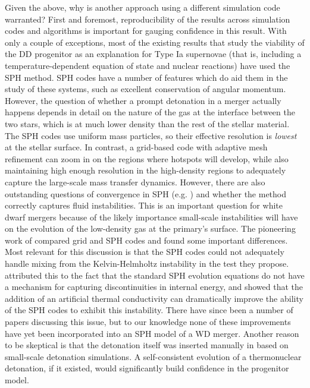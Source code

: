 \documentclass[12pt,preprint]{aastex}
\begin{document}
Given the above, why is another approach using a different simulation code warranted? First and foremost, reproducibility of the results across simulation codes and algorithms is important for gauging confidence in this result. With only a couple of exceptions, most of the existing results that study the viability of the DD progenitor as an explanation for Type Ia supernovae (that is, including a temperature-dependent equation of state and nuclear reactions) have used the SPH method. SPH codes have a number of features which do aid them in the study of these systems, such as excellent conservation of angular momentum. However, the question of whether a prompt detonation in a merger actually happens depends in detail on the nature of the gas at the interface between the two stars, which is at much lower density than the rest of the stellar material. The SPH codes use uniform mass particles, so their effective resolution is \textit{lowest} at the stellar surface. In contrast, a grid-based code with adaptive mesh refinement can zoom in on the regions where hotspots will develop, while also maintaining high enough resolution in the high-density regions to adequately capture the large-scale mass transfer dynamics. However, there are also outstanding questions of convergence in SPH (e.g. \cite{zhu_SPH:2014}) and whether the method correctly captures fluid instabilities. This is an important question for white dwarf mergers because of the likely importance small-scale instabilities will have on the evolution of the low-density gas at the primary's surface. The pioneering work of \cite{agertz:2007} compared grid and SPH codes and found some important differences. Most relevant for this discussion is that the SPH codes could not adequately handle mixing from the Kelvin-Helmholtz instability in the test they propose. \cite{price:2008} attributed this to the fact that the standard SPH evolution equations do not have a mechanism for capturing discontinuities in internal energy, and showed that the addition of an artificial thermal conductivity can dramatically improve the ability of the SPH codes to exhibit this instability. There have since been a number of papers discussing this issue, but to our knowledge none of these improvements have yet been incorporated into an SPH model of a WD merger. Another reason to be skeptical is that the detonation itself was inserted manually in \cite{pakmor:2010} based on small-scale detonation simulations. A self-consistent evolution of a thermonuclear detonation, if it existed, would significantly build confidence in the progenitor model.
\end{document}
